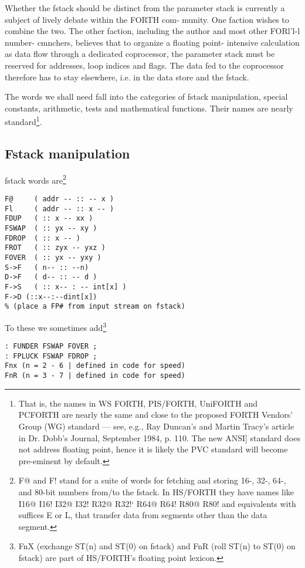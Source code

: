 \leftbar[1\linewidth] 
Whether the fstack should be distinct from the parameter stack
is currently a subject of lively debate within the FORTH com-
munity. One faction wishes to combine the two. The other
faction, including the author and most other FORl'l-l number-
cmnchers, believes that to organize a floating point- intensive
calculation as data ﬂow through a dedicated coprocessor, the
parameter stack must be reserved for addresses, loop indices and
ﬂags. The data fed to the coprocessor therefore has to stay
elsewhere, i.e. in the data store and the fstack.
\endleftbar

The words we shall need fall into the categories of fstack 
manipulation, special constants, arithmetic, tests and mathematical functions.
Their names are nearly standard\footnote{That is, the names in WS FORTH, PIS/FORTH, UniFORTH and PCFORTH are nearly the
same and close to the proposed FORTH Vendors' Group (WG) standard — see, e.g., Ray
Duncan's and Martin Tracy's article in Dr. Dobb's Journal, September 1984, p. 110. The new
ANSI] standard does not address floating point, hence it is likely the PVC standard will become
pre-eminent by default.}.

\subsection{Fstack manipulation}
 fstack words are\footnote{F@ and F! stand for a suite of words for
fetching and storing 16-, 32-, 64-, and 80-bit numbers
from/to the fstack. In HS/FORTH they have names like I16@ I16! I32@ I32! R32@ R32!`
R64@ R64! R80@ R80! and equivalents with suffices E or L, that transfer data from segments
other than the data segment.}
\begin{verbatim}
F@     ( addr -- :: -- x )
Fl     ( addr -- :: x -- )
FDUP   ( :: x -- xx )
FSWAP  ( :: yx -- xy )
FDROP  ( :: x -- )
FROT   ( :: zyx -- yxz )
FOVER  ( :: yx -- yxy )
S->F   ( n-- :: --n)
D->F   ( d-- :: -- d )
F->S   ( :: x-- : -- int[x] )
F->D (::x--:--dint[x])
% (place a FP# from input stream on fstack)
\end{verbatim}
 
To these we sometimes add\footnote{FnX (exchange ST(n) and ST(0) on fstack) and
FnR (roll ST(n) to ST(0) on fstack) are part of HS/FORTH’s floating point
lexicon.}

\begin{verbatim}
: FUNDER FSWAP FOVER ;
: FPLUCK FSWAP FDROP ;
Fnx (n = 2 - 6 | defined in code for speed)
FnR (n = 3 - 7 | defined in code for speed)
\end{verbatim}

